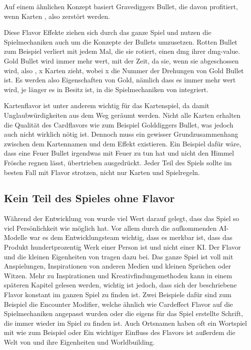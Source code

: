 Auf einem ähnlichen Konzept basiert Gravediggers Bullet, die davon profitiert, wenn Karten , also zerstört werden.


Diese Flavor Effekte ziehen sich durch das ganze Spiel und nutzen die Spielmechaniken auch um die Konzepte der Bullets umzusetzen.
Rotten Bullet zum Beispiel verliert mit jedem Mal, die sie rotiert, einen dmg ihrer dmg-value. Gold Bullet wird immer mehr
wert, mit der Zeit, da sie, wenn sie abgeschossen wird, also , x Karten zieht, wobei x die Nummer der Drehungen
von Gold Bullet ist. Es werden also Eigenschaften von Gold, nämlich dass es immer mehr wert wird, je länger es in Besitz ist,
in die Spielmechaniken von \FF integriert.


Kartenflavor ist unter anderem wichtig für das Kartenspiel, da damit Unglaubwürdigkeiten aus dem Weg geräumt werden.
Nicht alle Karten erhalten die Qualität des Cardflavors wie zum Beispiel Golddiggers Bullet, was jedoch auch nicht wirklich nötig ist.
Dennoch muss ein gewisser Grundzusammenhang zwischen dem Kartennamen und dem Effekt existieren.
Ein Beispiel dafür wäre, dass eine Feuer Bullet irgendwas mit Feuer zu tun hat und nicht den Himmel Frösche regnen lässt,
übertrieben ausgedrückt. Jeder Teil des Spiels sollte im besten Fall mit Flavor strotzen, nicht nur Karten und Spielregeln.



\subsection{Kein Teil des Spieles ohne Flavor}\label{subsec:keinTeildesSpielesOhneFlavor}

Während der Entwicklung von \FF wurde viel Wert darauf gelegt, dass das Spiel so viel Persönlichkeit wie möglich hat.
Vor allem durch die aufkommenden AI-Modelle war es dem Entwicklungsteam wichtig, dass es merkbar ist,
dass das Produkt hundertprozentig Werk einer Person ist und nicht einer KI.
Der Flavor und die kleinen Eigenheiten von \FF tragen dazu bei.
Das ganze Spiel ist voll mit Anspielungen, Inspirationen von anderen Medien und kleinen Sprüchen oder Witzen. Mehr zu Inspirationen und Kreativfindungsmethoden
kann in einem späteren Kapitel gelesen werden, wichtig ist jedoch, dass sich der beschriebene Flavor konstant im ganzen Spiel zu finden ist.
Zwei Beispiele dafür sind zum Beispiel die Encounter Modifier, welche ähnlich wie Cardeffect Flavor auf die Spielmechaniken
angepasst wurden oder die eigens für das Spiel erstellte Schrift, die immer wieder im Spiel zu finden ist. Auch Ortsnamen
haben oft ein Wortspiel mit  wie zum Beispiel  oder 
Ein wichtiger Einfluss des Flavors ist außerdem die Welt von \FF und ihre Eigenheiten und Worldbuilding.



